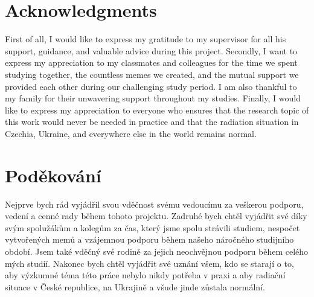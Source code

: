 
\section*{Acknowledgments}
First of all, I would like to express my gratitude to my supervisor for all his support, guidance, and valuable advice during this project.
Secondly, I want to express my appreciation to my classmates and colleagues for the time we spent studying together, the countless memes we created, and the mutual support we provided each other during our challenging study period.
I am also thankful to my family for their unwavering support throughout my studies.
Finally, I would like to express my appreciation to everyone who ensures that the research topic of this work would never be needed in practice and that the radiation situation in Czechia, Ukraine, and everywhere else in the world remains normal.

\vspace{2.5cm}








\section*{Poděkování}
Nejprve bych rád vyjádřil svou vděčnost svému vedoucímu za veškerou podporu, vedení a cenné rady během tohoto projektu. 
Zadruhé bych chtěl vyjádřit své díky svým spolužákům a kolegům za čas, který jsme spolu strávili studiem, nespočet vytvořených memů a vzájemnou podporu během našeho náročného studijního období. 
Jsem také vděčný své rodině za jejich neochvějnou podporu během celého mých studií. 
Nakonec bych chtěl vyjádřit své uznání všem, kdo se starají o to, aby výzkumné téma této práce nebylo nikdy potřeba v praxi a aby radiační situace v České republice, na Ukrajině a všude jinde zůstala normální.

